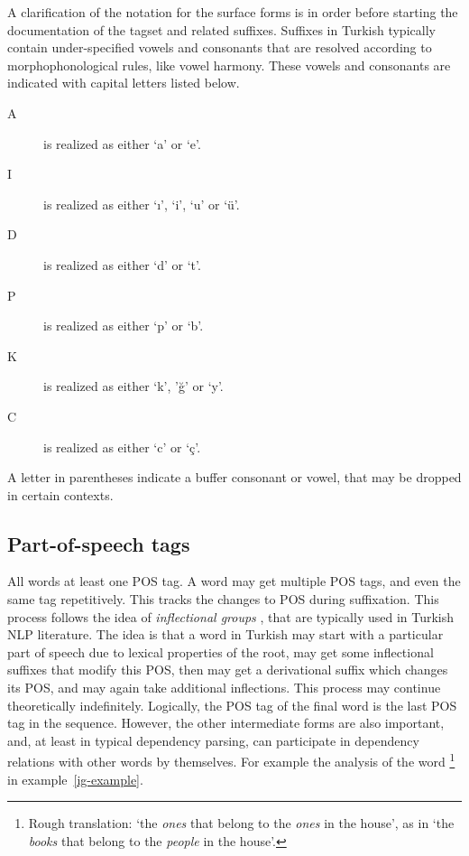 \documentclass[twocolumn]{article}
\begin{document}
A clarification of the notation for the surface forms is in order
before starting the documentation of the tagset and related suffixes.
Suffixes in Turkish typically contain under-specified vowels and
consonants that are resolved according to morphophonological rules,
like vowel harmony. These vowels and consonants are indicated with
capital letters listed below.

\begin{description}
\item[A] is realized as either `a' or  `e'.
\item[I] is realized as either `ı', `i', `u' or  `ü'.
\item[D] is realized as either `d' or  `t'.
\item[P] is realized as either `p' or  `b'.
\item[K] is realized as either `k', 'ğ' or  `y'.
\item[C] is realized as either `c' or  `ç'.
\end{description}

A letter in parentheses indicate a buffer consonant or vowel, that may
be dropped in certain contexts.

\subsection{Part-of-speech tags}

All words at least one POS tag. A word may get multiple POS tags, and
even the same tag repetitively. This tracks the changes to POS during
suffixation. This process follows the idea of \emph{inflectional
groups} \parencite[IGs,][]{oflazer1999,oflazer2003}, that are
typically used in Turkish NLP literature. The idea is that a word in
Turkish may start with a particular part of speech due to lexical
properties of the root, may get some inflectional suffixes that modify
this POS, then may get a derivational suffix which changes its POS,
and may again take additional inflections. This process may continue
theoretically indefinitely. Logically, the POS tag of the final word
is the last POS tag in the sequence. However, the other intermediate
forms are also important, and, at least in typical dependency parsing,
can participate in dependency relations with other words by
themselves. For example the analysis of the word
\footnote{Rough translation: `the \emph{ones} that belong
to the \emph{ones} in the house', as in `the \emph{books} that belong
to the \emph{people} in the house'.} in example~\ref{ig-example}.
\end{document}
